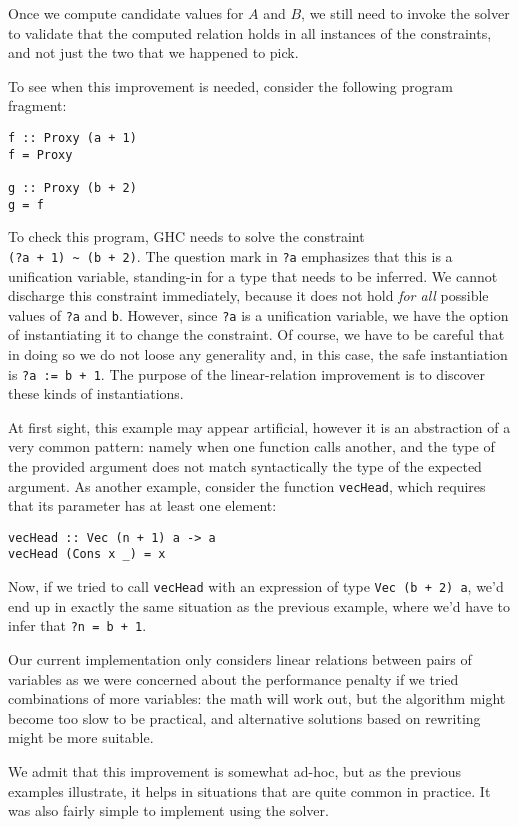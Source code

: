 \documentclass{sigplanconf}
\begin{document}
Once we compute candidate values for $A$ and $B$, we still need to
invoke the solver to validate that the computed relation holds in all
instances of the constraints, and not just the two that we happened to pick.

\break
To see when this improvement is needed, consider the following program
fragment:
\begin{Verbatim}
f :: Proxy (a + 1)
f = Proxy

g :: Proxy (b + 2)
g = f
\end{Verbatim}
To check this program, GHC needs to solve the constraint \\
\Verb"(?a + 1) ~ (b + 2)". The question mark in \Verb"?a" emphasizes that
this is a unification variable, standing-in for a type that needs to be
inferred. We cannot discharge this constraint immediately, because it
does not hold {\em for all} possible values of \Verb"?a" and \Verb"b".
However, since \Verb"?a" is a unification variable, we have the option
of instantiating it to change the constraint.  Of course, we have to
be careful that in doing so we do not loose any generality and, in this
case, the safe instantiation is \Verb"?a := b + 1".  The purpose of the
linear-relation improvement is to discover these kinds of
instantiations.

At first sight, this example may appear artificial, however it is an
abstraction of a very common pattern: namely when one function calls
another, and the type of the provided argument does not match
syntactically the type of the expected argument.  As another example,
consider the function \Verb"vecHead", which requires that its parameter
has at least one element:
\begin{Verbatim}
vecHead :: Vec (n + 1) a -> a
vecHead (Cons x _) = x
\end{Verbatim}
Now, if we tried to call \Verb"vecHead" with an expression of type
\Verb"Vec (b + 2) a", we'd end up in exactly the same situation as the
previous example, where we'd have to infer that \Verb"?n = b + 1".

Our current implementation only considers linear relations between pairs
of variables as we were concerned about the performance penalty if
we tried combinations of more variables: the math will work out, but
the algorithm might become too slow to be practical, and alternative
solutions based on rewriting might be more suitable.

We admit that this improvement is somewhat ad-hoc, but as the previous
examples illustrate, it helps in situations that are quite common in
practice.  It was also fairly simple to implement using the solver.
\end{document}

